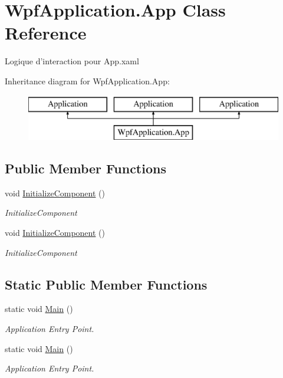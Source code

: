\hypertarget{class_wpf_application_1_1_app}{\section{Wpf\-Application.\-App Class Reference}
\label{class_wpf_application_1_1_app}
}


Logique d'interaction pour App.\-xaml  


Inheritance diagram for Wpf\-Application.\-App\-:\begin{figure}[H]
\begin{center}
\leavevmode
\includegraphics[height=2.000000cm]{class_wpf_application_1_1_app}
\end{center}
\end{figure}
\subsection*{Public Member Functions}
\begin{DoxyCompactItemize}
\item 
void \hyperlink{class_wpf_application_1_1_app_a85afd6d15ea6481274dd01c8f43afba0}{Initialize\-Component} ()
\begin{DoxyCompactList}\small\item\em Initialize\-Component \end{DoxyCompactList}\item 
void \hyperlink{class_wpf_application_1_1_app_a85afd6d15ea6481274dd01c8f43afba0}{Initialize\-Component} ()
\begin{DoxyCompactList}\small\item\em Initialize\-Component \end{DoxyCompactList}\end{DoxyCompactItemize}
\subsection*{Static Public Member Functions}
\begin{DoxyCompactItemize}
\item 
static void \hyperlink{class_wpf_application_1_1_app_a5495f372717728281b455336a48c5d4e}{Main} ()
\begin{DoxyCompactList}\small\item\em Application Entry Point. \end{DoxyCompactList}\item 
static void \hyperlink{class_wpf_application_1_1_app_a5495f372717728281b455336a48c5d4e}{Main} ()
\begin{DoxyCompactList}\small\item\em Application Entry Point. \end{DoxyCompactList}\end{DoxyCompactItemize}


